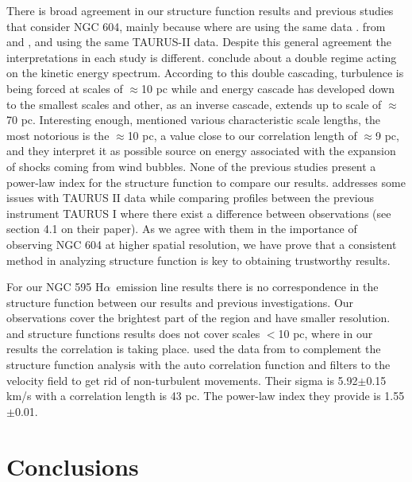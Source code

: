 \documentclass[fleqn,usenatbib, useAMS, a4paper]{mnras}
\newcommand\halpha{H${\alpha}$}
\begin{document}
There is broad agreement in our structure function results and previous studies that consider NGC 604, mainly because where are using the same data \citep{Medina-Tanco:1997a, Melnick:2021x}. 
from \citet{Medina-Tanco:1997a} and \citet{Melnick:2021x}, and using the same TAURUS-II data.
Despite this general agreement the interpretations in each study is different.
\citet{Medina-Tanco:1997a} conclude about a double regime acting on the kinetic energy spectrum.
According to this double cascading, turbulence is being forced at scales of \(\approx\)10 pc while and energy cascade has developed down to the smallest scales and other, as an inverse cascade, extends up to scale of \(\approx\)70 pc.
Interesting enough, \citet{Medina-Tanco:1997a} mentioned various characteristic scale lengths, the most notorious is the \(\approx\)10 pc, a value close to our correlation length of \(\approx\)9 pc, and they interpret it as possible source on energy associated with the expansion of shocks coming from wind bubbles.  
None of the previous studies present a power-law index for the structure function to compare our results.
\citet{2019arXiv191203543M} addresses some issues with TAURUS II data while comparing profiles between the previous instrument TAURUS I where there exist a difference between observations (see section 4.1 on their paper).
As we agree with them in the importance of observing NGC 604 at higher spatial resolution, we have prove that a consistent method in analyzing structure function is key to obtaining trustworthy results.

For our NGC 595 \halpha\ emission line results there is no correspondence in the structure function between our results and previous investigations.
Our observations cover the brightest part of the region and have smaller resolution.
\citet{lagrois2009multi} and \citet{lagrois2011} structure functions results does not cover scales $<$10 pc, where in our results the correlation is taking place.
\citet{lagrois2011} used the data from \citet{lagrois2009multi} to complement the structure function analysis with the auto correlation function and filters to the velocity field to get rid of non-turbulent movements.
Their sigma is 5.92$\pm$0.15 km/s with a correlation length is 43 pc.
The power-law index they provide is 1.55$\pm$0.01.


\section{Conclusions}\label{sec:conclusions}
\end{document}
